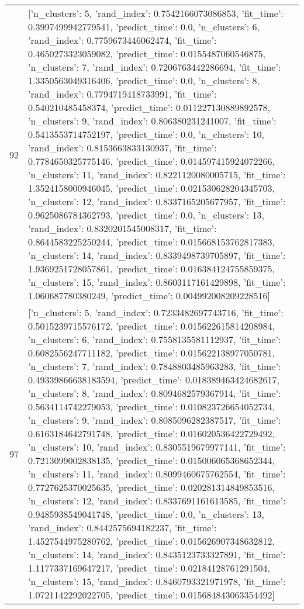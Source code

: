 \begin{tabular}{rl}
92 & [{'n_clusters': 5, 'rand_index': 0.7542166073086853, 'fit_time': 0.3997499942779541, 'predict_time': 0.0}, {'n_clusters': 6, 'rand_index': 0.7759673446062474, 'fit_time': 0.4650273323059082, 'predict_time': 0.0155487060546875}, {'n_clusters': 7, 'rand_index': 0.7206763442286694, 'fit_time': 1.3350563049316406, 'predict_time': 0.0}, {'n_clusters': 8, 'rand_index': 0.7794719418733991, 'fit_time': 0.540210485458374, 'predict_time': 0.011227130889892578}, {'n_clusters': 9, 'rand_index': 0.806380231241007, 'fit_time': 0.5413553714752197, 'predict_time': 0.0}, {'n_clusters': 10, 'rand_index': 0.8153663833130937, 'fit_time': 0.7784650325775146, 'predict_time': 0.014597415924072266}, {'n_clusters': 11, 'rand_index': 0.8221120080005715, 'fit_time': 1.3524158000946045, 'predict_time': 0.021530628204345703}, {'n_clusters': 12, 'rand_index': 0.8337165205677957, 'fit_time': 0.9625086784362793, 'predict_time': 0.0}, {'n_clusters': 13, 'rand_index': 0.8320201545008317, 'fit_time': 0.8644583225250244, 'predict_time': 0.015668153762817383}, {'n_clusters': 14, 'rand_index': 0.8339498739705897, 'fit_time': 1.9369251728057861, 'predict_time': 0.016384124755859375}, {'n_clusters': 15, 'rand_index': 0.8603117161429898, 'fit_time': 1.060687780380249, 'predict_time': 0.004992008209228516}] \\
97 & [{'n_clusters': 5, 'rand_index': 0.7233482697743716, 'fit_time': 0.5015239715576172, 'predict_time': 0.015622615814208984}, {'n_clusters': 6, 'rand_index': 0.7558135581112937, 'fit_time': 0.6082556247711182, 'predict_time': 0.015622138977050781}, {'n_clusters': 7, 'rand_index': 0.7848803485963283, 'fit_time': 0.49339866638183594, 'predict_time': 0.018389463424682617}, {'n_clusters': 8, 'rand_index': 0.8094682579367914, 'fit_time': 0.5634114742279053, 'predict_time': 0.010823726654052734}, {'n_clusters': 9, 'rand_index': 0.8085096282387517, 'fit_time': 0.6163184642791748, 'predict_time': 0.016020536422729492}, {'n_clusters': 10, 'rand_index': 0.8305519679977141, 'fit_time': 0.7213099002838135, 'predict_time': 0.015006065368652344}, {'n_clusters': 11, 'rand_index': 0.8099460675762554, 'fit_time': 0.7727625370025635, 'predict_time': 0.020281314849853516}, {'n_clusters': 12, 'rand_index': 0.8337691161613585, 'fit_time': 0.9485938549041748, 'predict_time': 0.0}, {'n_clusters': 13, 'rand_index': 0.8442575694182237, 'fit_time': 1.4527544975280762, 'predict_time': 0.015626907348632812}, {'n_clusters': 14, 'rand_index': 0.8435123733327891, 'fit_time': 1.1177337169647217, 'predict_time': 0.02184128761291504}, {'n_clusters': 15, 'rand_index': 0.8460793321971978, 'fit_time': 1.0721142292022705, 'predict_time': 0.015684843063354492}] \\

\end{tabular}
